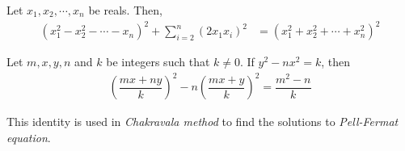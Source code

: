 \documentclass[main.tex]{subfile}
\begin{document}
\begin{appendix}
	\begin{identity}\label{id:euleraida}
		Let $x_1,x_2,\cdots,x_n$ be reals. Then,
		\begin{align*}
			(x_1^2-x_2^2-\cdots-x_n)^2 + \sum_{i=2}^{n}(2x_1x_i)^2 & = (x_1^2+x_2^2+\cdots+x_n^2)^2
		\end{align*}
	\end{identity}

	\begin{identity}
		Let $m,x,y,n$ and $k$ be integers such that $k \neq 0$. If $y^2-nx^2=k$, then
		\begin{align*}
			\left( \dfrac{mx+ny}{k}\right) ^2-n\left( \dfrac{mx+y}{k}\right)^2= \dfrac{m^2-n}{k}
		\end{align*}
	\end{identity}
	This identity is used in {\it Chakravala method} to find the solutions to {\it Pell-Fermat equation}.
\end{appendix}
\end{document}
